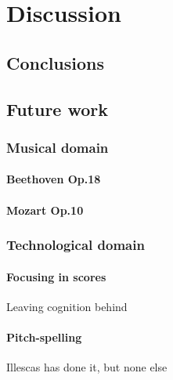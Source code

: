 \chapter{Discussion}
\label{chap:discussion}

\section{Conclusions}

\section{Future work}
  \subsection{Musical domain}
    \subsubsection{Beethoven Op.18}
    \subsubsection{Mozart Op.10}
  \subsection{Technological domain}
    \subsubsection{Focusing in scores}
    Leaving cognition behind
    \subsubsection{Pitch-spelling}
    Illescas has done it, but none else

\newpage
